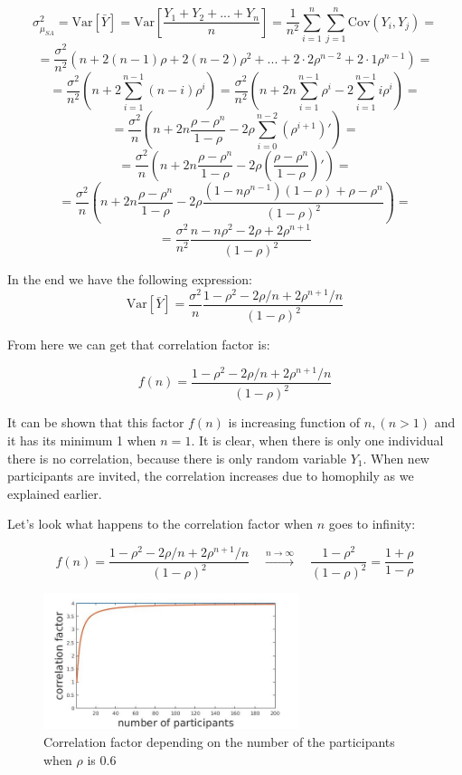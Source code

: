 \documentclass[12pt]{report}
\begin{document}
$$\sigma^2_{\hat{\mu}_{SA}} = \mathrm{Var}\left[\bar{Y} \right] = \mathrm{Var}\left[ \frac{Y_1 + Y_2 + ...+ Y_n}{n} \right] = \frac{1}{n^2} \sum_{i=1}^{n}\sum_{j=1}^{n} \mathrm{Cov}(Y_i, Y_j) =$$ 
$$ = \frac{\sigma^2}{n^2} \left( n + 2(n-1)\rho + 2(n-2)\rho^2 + ... + 2\cdot2 \rho^{n-2}+ 2\cdot1 \rho^{n-1} \right) = $$
$$ = \frac{\sigma^2}{n^2} \left(n + 2\sum_{i=1}^{n-1} (n-i)\rho^i \right) = \frac{\sigma^2}{n^2} \left(n + 2n\sum_{i=1}^{n-1}\rho^i - 2\sum_{i=1}^{n-1}i\rho^i \right) = $$
$$ = \frac{\sigma^2}{n} \left(n + 2n\frac{\rho-\rho^{n}}{1-\rho} - 2\rho \sum_{i=0}^{n-2} (\rho^{i+1})' \right) = $$
$$ = \frac{\sigma^2}{n} \left(n + 2n\frac{\rho-\rho^{n}}{1-\rho} - 2\rho\left(\frac{\rho-\rho^n}{1-\rho}\right)' \right) = $$
$$ = \frac{\sigma^2}{n} \left(n + 2n\frac{\rho-\rho^{n}}{1-\rho} - 2\rho \frac{(1-n\rho^{n-1})(1-\rho) + \rho - \rho^n}{(1-\rho)^2} \right) = $$
$$ = \frac{\sigma^2}{n^2} \frac{n-n\rho^2 - 2\rho + 2\rho^{n+1}}{(1-\rho)^2}$$

In the end we have the following expression:
\begin{equation}\label{eq:varFirst}
\mathrm{Var}\left[\bar{Y} \right] = \frac{\sigma^2}{n}\frac{1-\rho^2 - 2\rho/n + 2\rho^{n+1}/n}{(1-\rho)^2}
\end{equation}


From here we can get that correlation factor is:

$$f(n) = \frac{1-\rho^2 - 2\rho/n + 2\rho^{n+1}/n}{(1-\rho)^2} $$

It can be shown that this factor $f(n)$ is increasing function of $n, (n > 1)$ and it has its minimum 1 when $n = 1$. It is clear, when there is only one individual there is no correlation, because there is only random variable $Y_1$. When new participants are invited, the correlation increases due to homophily as we explained earlier.

Let's look what happens to the correlation factor when $n$ goes to infinity:

$$f(n)  = \frac{1-\rho^2 - 2\rho/n + 2\rho^{n+1}/n}{(1-\rho)^2} \quad \xrightarrow{n\to \infty} \quad\frac{1-\rho^2}{(1-\rho)^2} = \frac{1+\rho}{1-\rho}$$

\begin{figure}[ht]
    \centering
    \includegraphics[height=150px]{corrFactor}
    \caption{ Correlation factor depending on the number of the participants when $\rho$ is 0.6 }
\end{figure}
\end{document}
